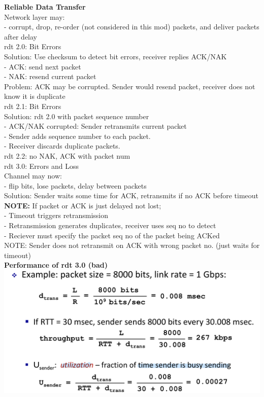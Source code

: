 \documentclass[10pt, a4paper]{article}
\newcommand{\highlight}[1]{{\color{red}\textbf{#1}}}
\newcommand{\blue}[1]{{\color{MidnightBlue}#1}}
\newcommand{\red}[1]{{\color{red}#1}}
\newcommand{\green}[1]{{\color{ForestGreen}#1}}
\begin{document}
\begin{multicols*}{3}
		\textbf{Reliable Data Transfer}\\
		Network layer may:\\
		- corrupt, drop, re-order (not considered in this mod) packets, and deliver packets after delay\\

		rdt 2.0: \red{Bit Errors}\\
		\green{Solution:} Use checksum to detect bit errors, receiver replies \blue{ACK/NAK}\\
		- ACK: send next packet\\
		- NAK: resend current packet\\
		\red{Problem:} ACK may be corrupted. Sender would resend packet, receiver does not know it is duplicate\\

		rdt 2.1: \red{Bit Errors}\\
		\green{Solution:} rdt 2.0 with packet sequence number\\
		- ACK/NAK corrupted: Sender retransmits current packet\\
		- Sender adds sequence number to each packet.\\
		- Receiver discards duplicate packets.\\
		rdt 2.2: no NAK, ACK with packet num\\

		rdt 3.0: \red{Errors and Loss}\\
		Channel may now:\\
		- flip bits, lose packets, delay between packets\\
		\green{Solution:} Sender waits some time for ACK, \blue{retransmits} if no ACK before \blue{timeout}\\
		\highlight{NOTE:} If packet or ACK is just delayed not lost;\\
		- Timeout triggers retransmission\\
		- Retransmission generates \blue{duplicates}, receiver uses seq no to detect\\
		- Reciever must specify the packet seq no of the packet being ACKed\\
		\red{NOTE:} Sender does not retransmit on ACK with \red{wrong packet no.} (just waits for timeout)\\

		\textbf{Performance of rdt 3.0 (bad)}\\
		\includegraphics[scale=.145]{./assets/rdtPerformance}


\end{multicols*}
\end{document}
